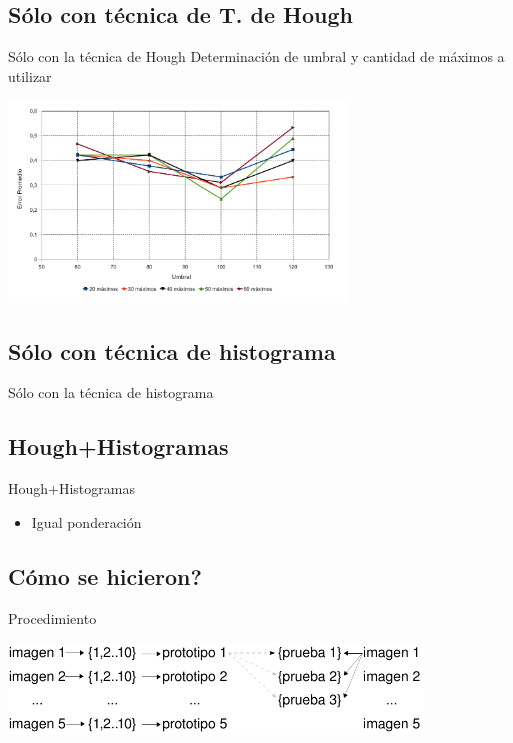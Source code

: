 \documentclass[spanish]{beamer}
\begin{document}
\subsection{Sólo con técnica de T. de Hough}
\begin{frame}{Sólo con la técnica de Hough}
  Determinación de umbral y cantidad de máximos a utilizar
  \begin{center}
    \includegraphics[width=9cm]{../diagramas/estadistica_noche_iguales}
  \end{center}
\end{frame}
%
\subsection{Sólo con técnica de histograma}
\begin{frame}{Sólo con la técnica de histograma}
\end{frame}
%
\subsection{Hough+Histogramas}
\begin{frame}{Hough+Histogramas}
  \begin{itemize}
  \item Igual ponderación
  \end{itemize}
\end{frame}
%
\subsection{Cómo se hicieron?}
\begin{frame}{Procedimiento}
  \begin{center}
    \includegraphics[width=11cm]{../diagramas/generacion-prototipos}
  \end{center}
\end{frame}
%
\end{document}
